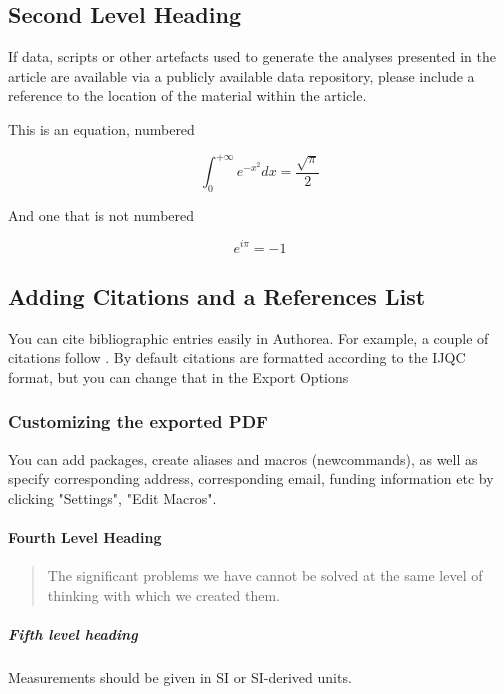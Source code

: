 \subsection{Second Level Heading}
If data, scripts or other artefacts used to generate the analyses presented in the article are available via a publicly available data repository, please include a reference to the location of the material within the article.

This is an equation, numbered

\begin{equation}
\label{eqn:some}
\int_0^{+\infty}e^{-x^2}dx=\frac{\sqrt{\pi}}{2}
\end{equation}

And one that is not numbered

\begin{equation*}
e^{i\pi}=-1
\end{equation*}

\subsection{Adding Citations and a References List}

You can cite bibliographic entries easily in Authorea. For example, a couple of citations follow \cite{Cavalleri_2016}. By default citations are formatted according to the IJQC format, but you can change that in the Export Options \cite{Meskine_2019}

\subsubsection{Customizing the exported PDF}
You can add packages, create aliases and macros (newcommands), as well as specify corresponding address, corresponding email, funding information etc by clicking "Settings", "Edit Macros".

\paragraph{Fourth Level Heading}

\begin{quote}
The significant problems we have cannot be solved at the same level of thinking with which we created them.
\end{quote}


\subparagraph{Fifth level heading}
Measurements should be given in SI or SI-derived units.
